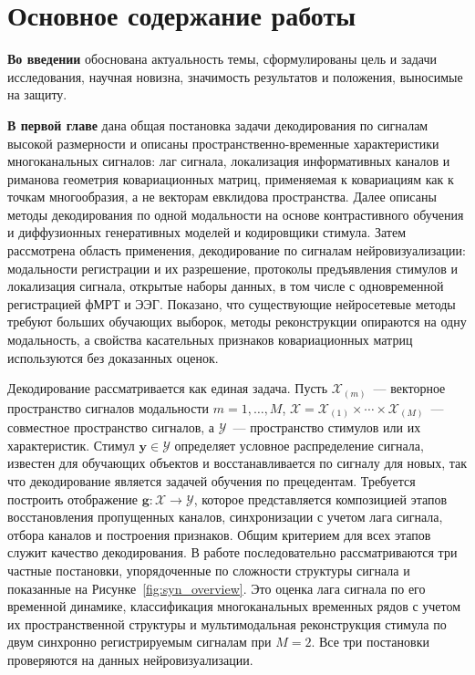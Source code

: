 \section*{Основное содержание работы}

\textbf{Во введении} обоснована актуальность темы, сформулированы цель и задачи исследования, научная новизна, значимость результатов и положения, выносимые на защиту.

\textbf{В первой главе} дана общая постановка задачи декодирования по сигналам высокой размерности и описаны пространственно-временные характеристики многоканальных сигналов: лаг сигнала, локализация информативных каналов и риманова геометрия ковариационных матриц, применяемая к ковариациям как к точкам многообразия, а не векторам евклидова пространства. Далее описаны методы декодирования по одной модальности на основе контрастивного обучения и диффузионных генеративных моделей и кодировщики стимула. Затем рассмотрена область применения, декодирование по сигналам нейровизуализации: модальности регистрации и их разрешение, протоколы предъявления стимулов и локализация сигнала, открытые наборы данных, в том числе с одновременной регистрацией фМРТ и ЭЭГ. Показано, что существующие нейросетевые методы требуют больших обучающих выборок, методы реконструкции опираются на одну модальность, а свойства касательных признаков ковариационных матриц используются без доказанных оценок.

Декодирование рассматривается как единая задача. Пусть $\mathcal{X}_{(m)}$~--- векторное пространство сигналов модальности $m = 1, \ldots, M$, $\mathcal{X} = \mathcal{X}_{(1)} \times \cdots \times \mathcal{X}_{(M)}$~--- совместное пространство сигналов, а $\mathcal{Y}$~--- пространство стимулов или их характеристик. Стимул $\mathbf{y} \in \mathcal{Y}$ определяет условное распределение сигнала, известен для обучающих объектов и восстанавливается по сигналу для новых, так что декодирование является задачей обучения по прецедентам. Требуется построить отображение $\mathbf{g}\colon \mathcal{X} \to \mathcal{Y}$, которое представляется композицией этапов восстановления пропущенных каналов, синхронизации с учетом лага сигнала, отбора каналов и построения признаков. Общим критерием для всех этапов служит качество декодирования. В работе последовательно рассматриваются три частные постановки, упорядоченные по сложности структуры сигнала и показанные на Рисунке~\ref{fig:syn_overview}. Это оценка лага сигнала по его временной динамике, классификация многоканальных временных рядов с учетом их пространственной структуры и мультимодальная реконструкция стимула по двум синхронно регистрируемым сигналам при $M = 2$. Все три постановки проверяются на данных нейровизуализации.

